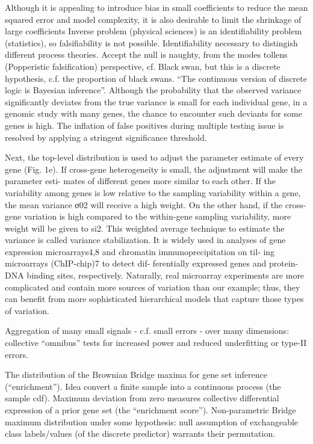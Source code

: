 \documentclass{article}
\begin{document}
Although it is appealing to introduce bias in small coefficients to reduce the mean squared error and model complexity, it is also desirable to limit the shrinkage of large coefficients 
Inverse problem (physical sciences) is an identifiability problem (statistics), so falsifiability is not possible. Identifiability necessary to distingish different process theories. Accept the null is naughty, from the modes tollens (Popperistic falsification) perspective, cf. Black swan, but this is a discrete hypothesis, c.f. the proportion of black swans. ``The continuous version of discrete logic is Bayesian inference''. 
Although the probability that the observed variance significantly deviates from the true variance is small for each individual gene, in a genomic study with many genes, the chance to encounter such deviants for some genes is high. The inflation of false positives during multiple testing issue is resolved by applying a stringent significance threshold.
 
Next, the top-level distribution is used to adjust the parameter estimate of every gene (Fig. 1e). If cross-gene heterogeneity is small, the adjustment will make the parameter esti- mates of different genes more similar to each other.
If the variability among genes is low relative to the sampling variability within a gene, the mean variance σ02 will receive a high weight. On the other hand, if the cross-gene variation is high compared to the within-gene sampling variability, more weight will be given to si2.
This weighted average technique to estimate the variance is called variance stabilization. It is widely used in analyses of gene expression microarrays4,8 and chromatin immunoprecipitation on til- ing microarrays (ChIP-chip)7 to detect dif- ferentially expressed genes and protein-DNA binding sites, respectively. Naturally, real microarray experiments are more complicated and contain more sources of variation than our example; thus, they can benefit from more sophisticated hierarchical models that capture those types of variation.

Aggregation of many small signals - c.f. small errors - over many dimensions: collective ``omnibus'' tests for increased power and reduced underfitting or type-II errors. 

The distribution of the Brownian Bridge maxima for gene set inference (``enrichment'').
Idea convert a finite sample into a continuous process (the sample cdf). Maximum deviation from zero measures collective differential expression of a prior gene set (the ``enrichment score''). Non-parametric Bridge maximum distribution under some hypothesis: null assumption of exchangeable class labels/values (of the discrete predictor) warrants their permutation.
\end{document}
